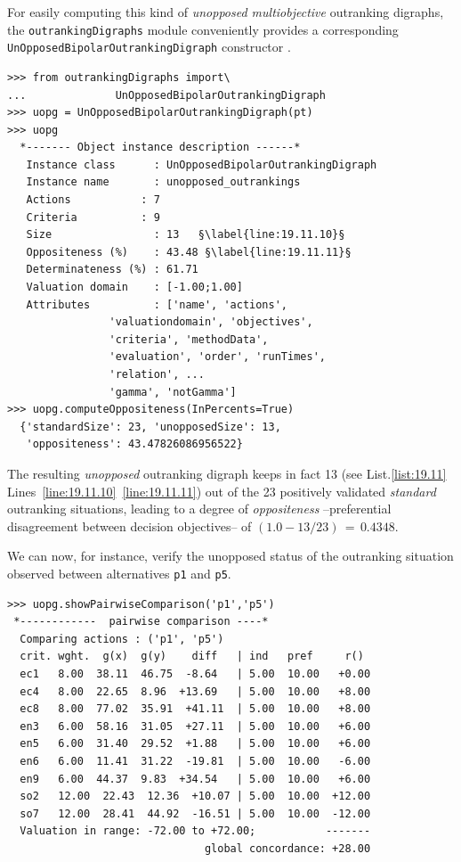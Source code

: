 For easily computing this kind of \emph{unopposed multiobjective} outranking digraphs, the \texttt{outrankingDigraphs} module conveniently provides a corresponding\\ \texttt{UnOpposedBipolarOutrankingDigraph} constructor .
\begin{lstlisting}[caption={Computing unopposed outranking digraphs},label=list:19.11]
>>> from outrankingDigraphs import\
...              UnOpposedBipolarOutrankingDigraph
>>> uopg = UnOpposedBipolarOutrankingDigraph(pt)
>>> uopg
  *------- Object instance description ------*
   Instance class      : UnOpposedBipolarOutrankingDigraph
   Instance name       : unopposed_outrankings
   Actions           : 7
   Criteria          : 9
   Size                : 13   §\label{line:19.11.10}§
   Oppositeness (%)    : 43.48 §\label{line:19.11.11}§
   Determinateness (%) : 61.71
   Valuation domain    : [-1.00;1.00]
   Attributes          : ['name', 'actions',
                'valuationdomain', 'objectives',
                'criteria', 'methodData',
                'evaluation', 'order', 'runTimes',
                'relation', ...
                'gamma', 'notGamma']
>>> uopg.computeOppositeness(InPercents=True)
  {'standardSize': 23, 'unopposedSize': 13,
   'oppositeness': 43.47826086956522}			   
\end{lstlisting}

The resulting \emph{unopposed} outranking digraph keeps in fact 13 (see List.\vref{list:19.11} Lines~\ref{line:19.11.10}~\ref{line:19.11.11}) out of the 23 positively validated \emph{standard} outranking situations, leading to a degree of \emph{oppositeness} --preferential disagreement between decision objectives-- of $(1.0 - 13/23)\,=\,0.4348$.

We can now, for instance, verify the unopposed status of the outranking situation observed between alternatives \texttt{p1} and \texttt{p5}.
\begin{lstlisting}[caption={Example of unopposed multiobjective outranking situation},label=list:19.12]
>>> uopg.showPairwiseComparison('p1','p5')
 *------------  pairwise comparison ----*
  Comparing actions : ('p1', 'p5')
  crit. wght.  g(x)  g(y)    diff   | ind   pref     r()
  ec1   8.00  38.11  46.75  -8.64   | 5.00  10.00   +0.00
  ec4   8.00  22.65  8.96  +13.69   | 5.00  10.00   +8.00
  ec8   8.00  77.02  35.91  +41.11  | 5.00  10.00   +8.00
  en3   6.00  58.16  31.05  +27.11  | 5.00  10.00   +6.00
  en5   6.00  31.40  29.52  +1.88   | 5.00  10.00   +6.00
  en6   6.00  11.41  31.22  -19.81  | 5.00  10.00   -6.00
  en9   6.00  44.37  9.83  +34.54   | 5.00  10.00   +6.00
  so2   12.00  22.43  12.36  +10.07 | 5.00  10.00  +12.00
  so7   12.00  28.41  44.92  -16.51 | 5.00  10.00  -12.00
  Valuation in range: -72.00 to +72.00;           -------
                               global concordance: +28.00
\end{lstlisting}


